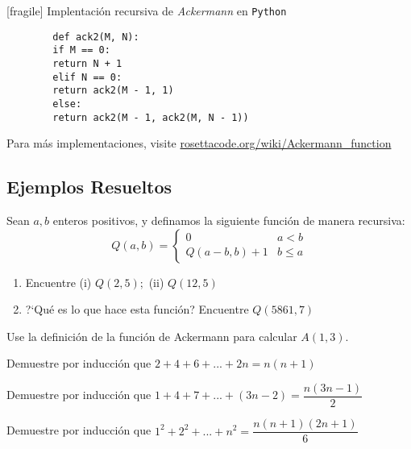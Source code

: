 [fragile]
	{Implentación recursiva de \emph{Ackermann} en \texttt{Python}}
	\begin{verbatim}
		def ack2(M, N):
		if M == 0:
		return N + 1
		elif N == 0:
		return ack2(M - 1, 1)
		else:
		return ack2(M - 1, ack2(M, N - 1))
	\end{verbatim}
	Para más implementaciones, visite \href{http://rosettacode.org/wiki/Ackermann\_function}{rosettacode.org/wiki/Ackermann\_function}


\subsection{Ejemplos Resueltos}


	\begin{problema}
		Sean $a,b$ enteros positivos, y definamos la siguiente función de manera recursiva:
		$$
		Q(a,b)=
		\begin{cases}
			0 & a<b \\
			Q(a-b,b)+1 & b \leq a
		\end{cases}
		$$
		\begin{enumerate}
			\item Encuentre (i) $Q(2,5);$ (ii) $Q(12,5)$
			\item ?`Qu\'e es lo que hace esta función? Encuentre $Q(5861,7)$
		\end{enumerate}
	\end{problema}



	\begin{problema}
		Use la definición de la función de Ackermann para calcular $A(1,3).$
	\end{problema}



	\begin{problema}
		Demuestre por inducción que 
		$\displaystyle 2+4+6+...+2n=n(n+1)$
	\end{problema}



	\begin{problema}
		Demuestre por inducción que 
		$\displaystyle 1+4+7+...+\left( 3n-2 \right)=\dfrac{n\left( 3n-1 \right)}{2}$
	\end{problema}



	\begin{problema}
		Demuestre por inducción que 
		$\displaystyle 1^{2}+2^{2}+...+n^{2}=\dfrac{n(n+1)(2n+1)}{6}$
	\end{problema}



